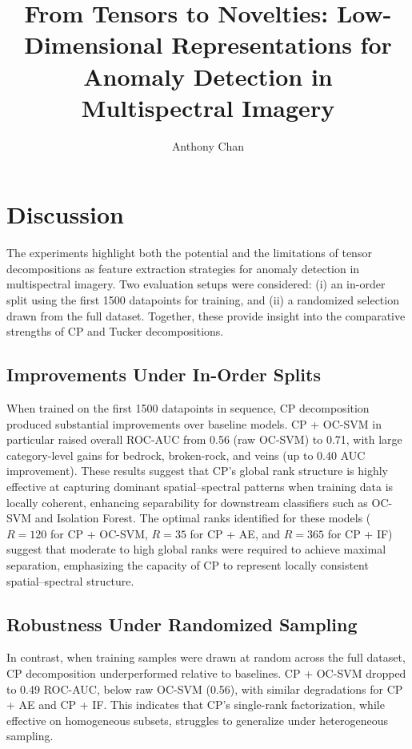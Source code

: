 \documentclass[11pt]{article}
\title{\textbf{From Tensors to Novelties: Low-Dimensional Representations for Anomaly Detection in Multispectral Imagery}}
\author{Anthony Chan}
\affil[1]{Georgia Institute of Technology, OMSA Practicum \\
\texttt{anthonycchan@gmail.com}}
\date{} %
\begin{document}
\maketitle

\section{Discussion}

The experiments highlight both the potential and the limitations of tensor decompositions as feature extraction strategies for anomaly detection in multispectral imagery. Two evaluation setups were considered: (i) an in-order split using the first 1500 datapoints for training, and (ii) a randomized selection drawn from the full dataset. Together, these provide insight into the comparative strengths of CP and Tucker decompositions.  

\subsection{Improvements Under In-Order Splits}

When trained on the first 1500 datapoints in sequence, CP decomposition produced substantial improvements over baseline models. CP + OC-SVM in particular raised overall ROC-AUC from 0.56 (raw OC-SVM) to 0.71, with large category-level gains for bedrock, broken-rock, and veins (up to 0.40 AUC improvement). These results suggest that CP’s global rank structure is highly effective at capturing dominant spatial–spectral patterns when training data is locally coherent, enhancing separability for downstream classifiers such as OC-SVM and Isolation Forest. The optimal ranks identified for these models (\(R=120\) for CP + OC-SVM, \(R=35\) for CP + AE, and \(R=365\) for CP + IF) suggest that moderate to high global ranks were required to achieve maximal separation, emphasizing the capacity of CP to represent locally consistent spatial–spectral structure.  

\subsection{Robustness Under Randomized Sampling}

In contrast, when training samples were drawn at random across the full dataset, CP decomposition underperformed relative to baselines. CP + OC-SVM dropped to 0.49 ROC-AUC, below raw OC-SVM (0.56), with similar degradations for CP + AE and CP + IF. This indicates that CP’s single-rank factorization, while effective on homogeneous subsets, struggles to generalize under heterogeneous sampling.  
\end{document}
